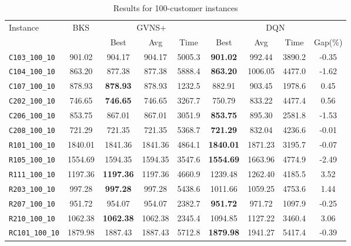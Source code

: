 \begin{table}[ht]
\centering
\small
\setlength{\tabcolsep}{5pt}
\caption{Results for 100-customer instances}
\vspace{4mm}
\begin{adjustbox}{width=\textwidth}
\begin{tabular}{l c c c c @{\hspace{8pt}} c c c c @{\hspace{8pt}}}
\toprule
\multirow{2}{*}{Instance} & \multirow{2}{*}{BKS} & \multicolumn{3}{c}{GVNS+} & \multicolumn{4}{c}{DQN} \\
\cmidrule(lr){3-5} \cmidrule(lr){6-9}
 &  & Best & Avg & Time & Best & Avg & Time & Gap(\%) \\
\midrule
\texttt{C103\_100\_10} & 901.02 & 904.17 & 904.17 & 5005.3 & \textbf{901.02} & 992.44 & 3890.2 & -0.35 \\
\texttt{C104\_100\_10} & 863.20 & 877.38 & 877.38 & 5888.4 & \textbf{863.20} & 1006.05 & 4477.0 & -1.62 \\
\texttt{C107\_100\_10} & 878.93 & \textbf{878.93} & 878.93 & 1232.5 & 882.91 & 903.45 & 1978.6 & 0.45 \\
\texttt{C202\_100\_10} & 746.65 & \textbf{746.65} & 746.65 & 3267.7 & 750.79 & 833.22 & 4477.4 & 0.56 \\
\texttt{C206\_100\_10} & 853.75 & 867.01 & 867.01 & 3051.9 & \textbf{853.75} & 895.30 & 2581.8 & -1.53 \\
\texttt{C208\_100\_10} & 721.29 & 721.35 & 721.35 & 5368.7 & \textbf{721.29} & 832.04 & 4236.6 & -0.01 \\
\texttt{R101\_100\_10} & 1840.01 & 1841.36 & 1841.36 & 4864.1 & \textbf{1840.01} & 1871.23 & 3195.7 & -0.07 \\
\texttt{R105\_100\_10} & 1554.69 & 1594.35 & 1594.35 & 3547.6 & \textbf{1554.69} & 1663.96 & 4774.9 & -2.49 \\
\texttt{R111\_100\_10} & 1197.36 & \textbf{1197.36} & 1197.36 & 4660.9 & 1239.48 & 1262.40 & 4185.5 & 3.52 \\
\texttt{R203\_100\_10} & 997.28 & \textbf{997.28} & 997.28 & 5438.6 & 1011.66 & 1059.25 & 4753.6 & 1.44 \\
\texttt{R207\_100\_10} & 951.72 & 954.07 & 954.07 & 2382.7 & \textbf{951.72} & 971.72 & 1097.9 & -0.25 \\
\texttt{R210\_100\_10} & 1062.38 & \textbf{1062.38} & 1062.38 & 2345.4 & 1094.85 & 1127.22 & 3460.4 & 3.06 \\
\texttt{RC101\_100\_10} & 1879.98 & 1887.43 & 1887.43 & 5712.8 & \textbf{1879.98} & 1941.27 & 5417.4 & -0.39 \\

\end{tabular}
\end{adjustbox}
\end{table}
